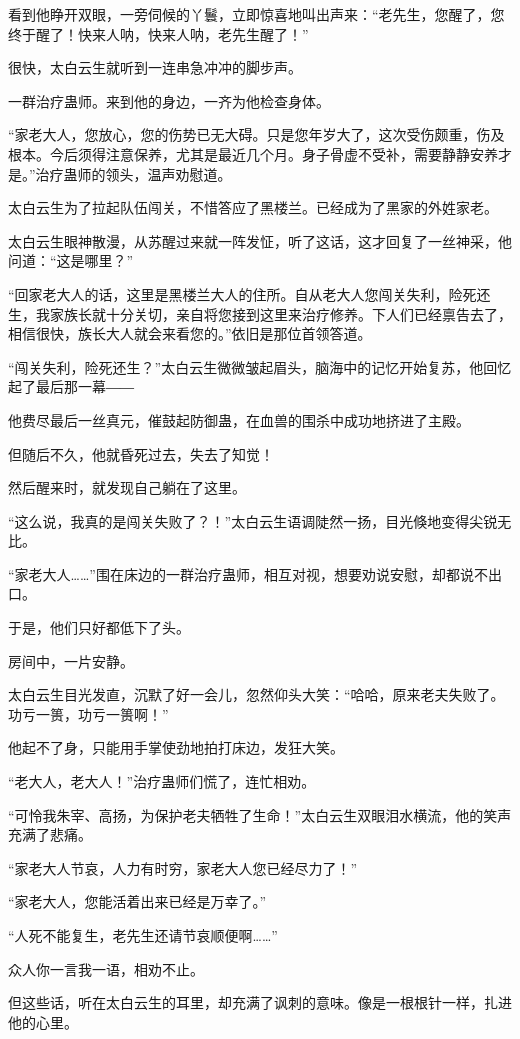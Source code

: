 \begin{this_body}
看到他睁开双眼，一旁伺候的丫鬟，立即惊喜地叫出声来：“老先生，您醒了，您终于醒了！快来人呐，快来人呐，老先生醒了！”

很快，太白云生就听到一连串急冲冲的脚步声。

一群治疗蛊师。来到他的身边，一齐为他检查身体。

“家老大人，您放心，您的伤势已无大碍。只是您年岁大了，这次受伤颇重，伤及根本。今后须得注意保养，尤其是最近几个月。身子骨虚不受补，需要静静安养才是。”治疗蛊师的领头，温声劝慰道。

太白云生为了拉起队伍闯关，不惜答应了黑楼兰。已经成为了黑家的外姓家老。

太白云生眼神散漫，从苏醒过来就一阵发怔，听了这话，这才回复了一丝神采，他问道：“这是哪里？”

“回家老大人的话，这里是黑楼兰大人的住所。自从老大人您闯关失利，险死还生，我家族长就十分关切，亲自将您接到这里来治疗修养。下人们已经禀告去了，相信很快，族长大人就会来看您的。”依旧是那位首领答道。

“闯关失利，险死还生？”太白云生微微皱起眉头，脑海中的记忆开始复苏，他回忆起了最后那一幕――

他费尽最后一丝真元，催鼓起防御蛊，在血兽的围杀中成功地挤进了主殿。

但随后不久，他就昏死过去，失去了知觉！

然后醒来时，就发现自己躺在了这里。

“这么说，我真的是闯关失败了？！”太白云生语调陡然一扬，目光倏地变得尖锐无比。

“家老大人……”围在床边的一群治疗蛊师，相互对视，想要劝说安慰，却都说不出口。

于是，他们只好都低下了头。

房间中，一片安静。

太白云生目光发直，沉默了好一会儿，忽然仰头大笑：“哈哈，原来老夫失败了。功亏一篑，功亏一篑啊！”

他起不了身，只能用手掌使劲地拍打床边，发狂大笑。

“老大人，老大人！”治疗蛊师们慌了，连忙相劝。

“可怜我朱宰、高扬，为保护老夫牺牲了生命！”太白云生双眼泪水横流，他的笑声充满了悲痛。

“家老大人节哀，人力有时穷，家老大人您已经尽力了！”

“家老大人，您能活着出来已经是万幸了。”

“人死不能复生，老先生还请节哀顺便啊……”

众人你一言我一语，相劝不止。

但这些话，听在太白云生的耳里，却充满了讽刺的意味。像是一根根针一样，扎进他的心里。


\end{this_body}
